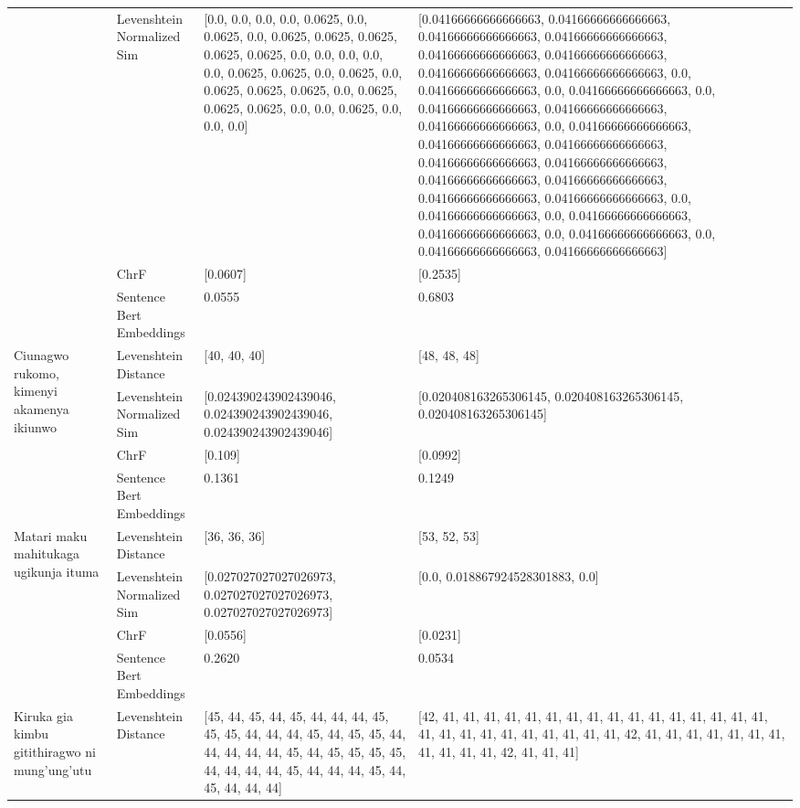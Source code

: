 \begin{tabular}{llll}
 & Levenshtein Normalized Sim & [0.0, 0.0, 0.0, 0.0, 0.0625, 0.0, 0.0625, 0.0, 0.0625, 0.0625, 0.0625, 0.0625, 0.0625, 0.0, 0.0, 0.0, 0.0, 0.0, 0.0625, 0.0625, 0.0, 0.0625, 0.0, 0.0625, 0.0625, 0.0625, 0.0, 0.0625, 0.0625, 0.0625, 0.0, 0.0, 0.0625, 0.0, 0.0, 0.0] & [0.04166666666666663, 0.04166666666666663, 0.04166666666666663, 0.04166666666666663, 0.04166666666666663, 0.04166666666666663, 0.04166666666666663, 0.04166666666666663, 0.0, 0.04166666666666663, 0.0, 0.04166666666666663, 0.0, 0.04166666666666663, 0.04166666666666663, 0.04166666666666663, 0.0, 0.04166666666666663, 0.04166666666666663, 0.04166666666666663, 0.04166666666666663, 0.04166666666666663, 0.04166666666666663, 0.04166666666666663, 0.04166666666666663, 0.04166666666666663, 0.0, 0.04166666666666663, 0.0, 0.04166666666666663, 0.04166666666666663, 0.0, 0.04166666666666663, 0.0, 0.04166666666666663, 0.04166666666666663] \\
 & ChrF & [0.0607] & [0.2535] \\
 & Sentence Bert Embeddings & 0.0555 & 0.6803 \\
\cline{1-4}
\multirow[t]{4}{*}{Ciunagwo rukomo, kimenyi akamenya ikiunwo} & Levenshtein Distance & [40, 40, 40] & [48, 48, 48] \\
 & Levenshtein Normalized Sim & [0.024390243902439046, 0.024390243902439046, 0.024390243902439046] & [0.020408163265306145, 0.020408163265306145, 0.020408163265306145] \\
 & ChrF & [0.109] & [0.0992] \\
 & Sentence Bert Embeddings & 0.1361 & 0.1249 \\
\cline{1-4}
\multirow[t]{4}{*}{Matari maku mahitukaga ugikunja ituma} & Levenshtein Distance & [36, 36, 36] & [53, 52, 53] \\
 & Levenshtein Normalized Sim & [0.027027027027026973, 0.027027027027026973, 0.027027027027026973] & [0.0, 0.018867924528301883, 0.0] \\
 & ChrF & [0.0556] & [0.0231] \\
 & Sentence Bert Embeddings & 0.2620 & 0.0534 \\
\cline{1-4}
\multirow[t]{4}{*}{Kiruka gia kimbu gitithiragwo ni mung’ung’utu} & Levenshtein Distance & [45, 44, 45, 44, 45, 44, 44, 44, 45, 45, 45, 44, 44, 44, 45, 44, 45, 45, 44, 44, 44, 44, 44, 45, 44, 45, 45, 45, 45, 44, 44, 44, 44, 45, 44, 44, 44, 45, 44, 45, 44, 44, 44] & [42, 41, 41, 41, 41, 41, 41, 41, 41, 41, 41, 41, 41, 41, 41, 41, 41, 41, 41, 41, 41, 41, 41, 41, 41, 41, 41, 42, 41, 41, 41, 41, 41, 41, 41, 41, 41, 41, 41, 42, 41, 41, 41] \\

\end{tabular}
